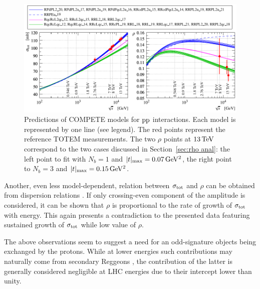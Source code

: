 \begin{figure}
\vskip-5mm
\begin{center}
\includegraphics{fig/compete_bands_si_tot_rho.pdf}
\caption{%
Predictions of COMPETE models \cite{compete-details} for $\rm pp$ interactions. Each model is represented by one line (see legend). The red points represent the reference TOTEM measurements. The two $\rho$ points at $13\,{\rm TeV}$ correspond to the two cases discussed in Section~\ref{sec:rho anal}: the left point to fit with $N_b=1$ and $|t|_{\rm max} = 0.07\,{\rm GeV^2}$, the right point to $N_b=3$ and $|t|_{\rm max} = 0.15\,{\rm GeV^2}$.
}
\label{fig:comp bands}
\end{center}
\end{figure}


Another, even less model-dependent, relation between $\sigma_{\rm tot}$ and $\rho$ can be obtained from dispersion relations . If only crossing-even component of the amplitude is considered, it can be shown that $\rho$ is proportional to the rate of growth of $\sigma_{\rm tot}$ with energy. This again presents a contradiction to the presented data featuring sustained growth of $\sigma_{\rm tot}$ while low value of $\rho$.

The above observations seem to suggest a need for an odd-signature objects being exchanged by the protons. While at lower energies such contributions may naturally come from secondary Reggeons , the contribution of the latter is generally considered negligible at LHC energies due to their intercept lower than unity.


